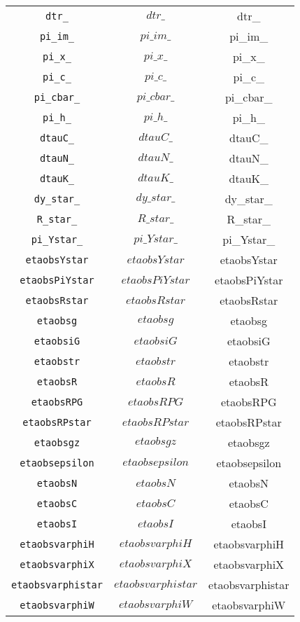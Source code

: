 \begin{center}
\begin{longtable}{ccc}
\texttt{dtr\_} & $dtr\_$ & dtr\_\\
\texttt{pi\_im\_} & $pi\_im\_$ & pi\_im\_\\
\texttt{pi\_x\_} & $pi\_x\_$ & pi\_x\_\\
\texttt{pi\_c\_} & $pi\_c\_$ & pi\_c\_\\
\texttt{pi\_cbar\_} & $pi\_cbar\_$ & pi\_cbar\_\\
\texttt{pi\_h\_} & $pi\_h\_$ & pi\_h\_\\
\texttt{dtauC\_} & $dtauC\_$ & dtauC\_\\
\texttt{dtauN\_} & $dtauN\_$ & dtauN\_\\
\texttt{dtauK\_} & $dtauK\_$ & dtauK\_\\
\texttt{dy\_star\_} & $dy\_star\_$ & dy\_star\_\\
\texttt{R\_star\_} & $R\_star\_$ & R\_star\_\\
\texttt{pi\_Ystar\_} & $pi\_Ystar\_$ & pi\_Ystar\_\\
\texttt{etaobsYstar} & $etaobsYstar$ & etaobsYstar\\
\texttt{etaobsPiYstar} & $etaobsPiYstar$ & etaobsPiYstar\\
\texttt{etaobsRstar} & $etaobsRstar$ & etaobsRstar\\
\texttt{etaobsg} & $etaobsg$ & etaobsg\\
\texttt{etaobsiG} & $etaobsiG$ & etaobsiG\\
\texttt{etaobstr} & $etaobstr$ & etaobstr\\
\texttt{etaobsR} & $etaobsR$ & etaobsR\\
\texttt{etaobsRPG} & $etaobsRPG$ & etaobsRPG\\
\texttt{etaobsRPstar} & $etaobsRPstar$ & etaobsRPstar\\
\texttt{etaobsgz} & $etaobsgz$ & etaobsgz\\
\texttt{etaobsepsilon} & $etaobsepsilon$ & etaobsepsilon\\
\texttt{etaobsN} & $etaobsN$ & etaobsN\\
\texttt{etaobsC} & $etaobsC$ & etaobsC\\
\texttt{etaobsI} & $etaobsI$ & etaobsI\\
\texttt{etaobsvarphiH} & $etaobsvarphiH$ & etaobsvarphiH\\
\texttt{etaobsvarphiX} & $etaobsvarphiX$ & etaobsvarphiX\\
\texttt{etaobsvarphistar} & $etaobsvarphistar$ & etaobsvarphistar\\
\texttt{etaobsvarphiW} & $etaobsvarphiW$ & etaobsvarphiW\\

\end{longtable}
\end{center}
